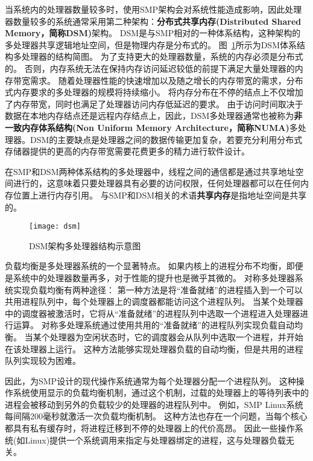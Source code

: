 	当系统内的处理器数量较多时，使用SMP架构会对系统性能造成影响，因此处理器数量较多的系统通常采用第二种架构：\textbf{分布式共享内存(Distributed Shared Memory，简称DSM)}架构。
	DSM是与SMP相对的一种体系结构，这种架构的多处理器共享逻辑地址空间，但是物理内存是分布式的。
	图~\ref{fig:dsm}所示为DSM体系结构多处理器的结构简图。
	为了支持更大的处理器数量，系统的内存必须是分布式的。
	否则，内存系统无法在保持内存访问延迟较低的前提下满足大量处理器的内存带宽需求。
	随着处理器性能的快速增加以及随之增长的内存带宽的需求，分布式内存要求的多处理器的规模将持续缩小。
	将内存分布在不停的结点上不仅增加了内存带宽，同时也满足了处理器访问内存低延迟的要求。
	由于访问时间取决于数据在本地内存结点还是远程内存结点上，因此，DSM多处理器通常也被称为\textbf{非一致内存体系结构(Non Uniform Memory Architecture，简称NUMA)}多处理器。DSM的主要缺点是处理器之间的数据传输更加复杂，若要充分利用分布式存储器提供的更高的内存带宽需要花费更多的精力进行软件设计。

在SMP和DSM两种体系结构的多处理器中，线程之间的通信都是通过共享地址空间进行的，这意味着只要处理器具有必要的访问权限，任何处理器都可以在任何内存位置上进行内存引用。
与SMP和DSM相关的术语\textbf{共享内存}是指地址空间是共享的。

\begin{figure}
\centering
\texttt{[image: dsm]}
\caption{DSM架构多处理器结构示意图}
\label{fig:dsm}
\end{figure}


负载均衡是多处理器系统的一个显著特点。
如果内核上的进程分布不均衡，即便是系统中的处理器数量再多，对于性能的提升也是微乎其微的。
对称多处理器系统实现负载均衡有两种途径：
第一种方法是将“准备就绪”的进程插入到一个可以共用进程队列中，每个处理器上的调度器都能访问这个进程队列。
当某个处理器中的调度器被激活时，它将从“准备就绪”的进程队列中选取一个进程进入处理器进行运算。
对称多处理系统通过使用共用的“准备就绪”的进程队列实现负载自动均衡。
当某个处理器为空闲状态时，它的调度器会从队列中选取一个进程，并开始在该处理器上运行。
这种方法能够实现处理器负载的自动均衡，但是共用的进程队列实现较为困难。

因此，为SMP设计的现代操作系统通常为每个处理器分配一个进程队列。
这种操作系统使用显示的负载均衡机制，通过这个机制，过载的处理器上的等待列表中的进程会被移动到另外的负载较少的处理器的进程队列中。
例如，SMP Linux系统每间隔200毫秒就激活一次负载均衡机制\cite{bolla2008effective}。
这种方法也存在一个问题，当每个核心都具有私有缓存时，将进程迁移到不停的处理器上的代价高昂。
因此一些操作系统(如Linux)提供一个系统调用来指定与处理器绑定的进程，这与处理器负载无关。


